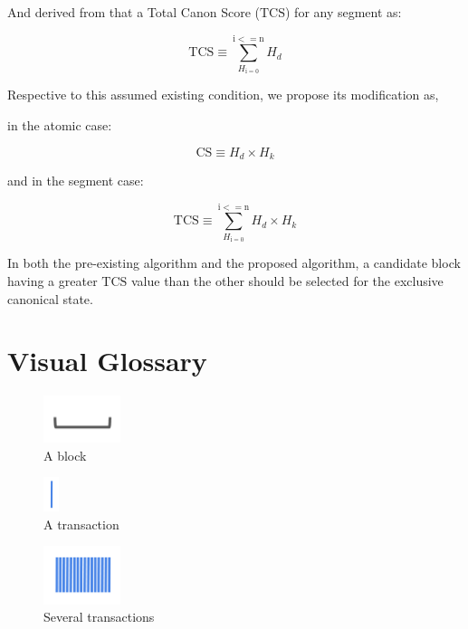 \documentclass[11pt]{article}
\theoremstyle{plain}
\begin{document}
And derived from that a Total Canon Score ($\mathrm{TCS}$) for any segment as:

\begin{equation}
\mathrm{TCS} \equiv \sum_{H_\mathrm{i = 0}}^{\mathrm{i <= n}} H_d
\end{equation}

Respective to this assumed existing condition, we propose its modification as,

in the atomic case:

\begin{equation}
\mathrm{CS} \equiv H_d \times H_k
\end{equation}

and in the segment case:

\begin{equation}
\mathrm{TCS} \equiv \sum_{H_\mathrm{i = 0}}^{\mathrm{i <= n}} H_d \times H_k
\end{equation}

In both the pre-existing algorithm and the proposed algorithm, a candidate
block having a greater $\mathrm{TCS}$ value than the other should be selected for
the exclusive canonical state.


\pagebreak
\section{\normalsize{Visual Glossary}}\label{sec: visual-glossary}

\begin{figure}[tph]
\centering
\includegraphics[width=0.2\textwidth]{vis_block.png}
\caption{A block}
\label{fig:block}
\end{figure}

\begin{figure}[tph]
\centering
\includegraphics[height=1cm]{vis_tx.png}
\caption{A transaction}
\label{fig:tx}
\end{figure}

\begin{figure}[tph]
\centering
\includegraphics[width=0.2\textwidth]{vis_tx_set.png}
\caption{Several transactions}
\label{fig:txs}
\end{figure}
\end{document}
